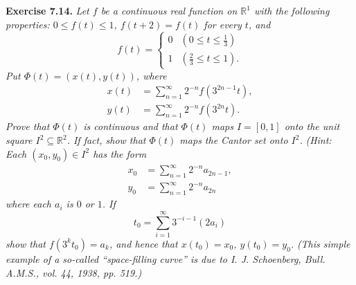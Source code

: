 \documentclass{article}
\begin{document}



\textbf{Exercise 7.14.}
\emph{Let $f$ be a continuous real function on $\mathbb{R}^1$
with the following properties:
$0 \leq f(t) \leq 1$, $f(t+2)=f(t)$ for every $t$, and
\begin{equation*}
  f(t) =
    \begin{cases}
      0 & \left(0 \leq t \leq \frac{1}{3}\right) \\
      1 & \left(\frac{2}{3} \leq t \leq 1\right).
    \end{cases}
\end{equation*}
Put $\Phi(t) = (x(t),y(t))$, where
\begin{align*}
  x(t) &= \sum_{n=1}^{\infty} 2^{-n} f(3^{2n-1}t), \\
  y(t) &= \sum_{n=1}^{\infty} 2^{-n} f(3^{2n}t).
\end{align*}
Prove that $\Phi(t)$ is continuous and
that $\Phi(t)$ maps $I = [0,1]$ onto the unit square $I^2 \subseteq \mathbb{R}^2$.
If fact, show that $\Phi(t)$ maps the Cantor set onto $I^2$.}
\emph{(Hint: Each $(x_0,y_0) \in I^2$ has the form
\begin{align*}
  x_0 &= \sum_{n=1}^{\infty} 2^{-n} a_{2n-1}, \\
  y_0 &= \sum_{n=1}^{\infty} 2^{-n} a_{2n}
\end{align*}
where each $a_i$ is $0$ or $1$.
If
\[
  t_0 = \sum_{i=1}^{\infty} 3^{-i-1}(2a_i)
\]
show that $f(3^kt_0) = a_k$, and hence that $x(t_0) = x_0$, $y(t_0) = y_0$.}
\emph{(This simple example of a so-called ``space-filling curve''
is due to I. J. Schoenberg, Bull. A.M.S., vol. 44, 1938, pp. 519.)} \\
\end{document}
